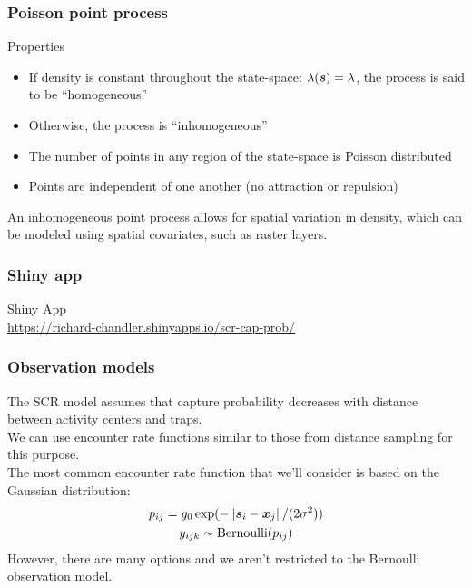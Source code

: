 \documentclass[color=usenames,dvipsnames]{beamer}\usepackage[]{graphicx}\usepackage[]{color}
\begin{document}
\begin{frame}
  \frametitle{Poisson point process}
  Properties
  \begin{itemize}
    \item If density is constant throughout the state-space:
      $\lambda({\bm s}) = \lambda$, the process is said to be
      ``homogeneous''
    \item Otherwise, the process is ``inhomogeneous''
    \item The number of points in any region of the state-space is
      Poisson distributed
    \item Points are independent of one another (no attraction or
      repulsion) 
  \end{itemize}
  \pause
  \vfill
  An inhomogeneous point process allows for spatial variation
  in density, which can be modeled using \alert{spatial covariates},
  such as raster layers. \\
\end{frame}






\begin{frame}
  \frametitle{Shiny app}
  \LARGE
  \centering
  Shiny App \\
  \vfill
  \normalsize
  \color{blue}
  \url{
    https://richard-chandler.shinyapps.io/scr-cap-prob/
  } \\
\end{frame}




\begin{frame}
  \frametitle{Observation models}
  The SCR model assumes that capture probability decreases with
  distance between activity centers and traps. \\
  \pause
  \vfill
  We can use encounter rate functions similar to those from distance 
  sampling for this purpose. \\
  \pause
  \vfill
  The most common encounter rate function that we'll consider is based
  on the Gaussian distribution:
  \begin{gather*}
    p_{ij} = g_0\exp(-\|{\bm s}_i - {\bm x}_j\|/(2\sigma^2)) \\
    y_{ijk} \sim \mathrm{Bernoulli}(p_{ij}) 
  \end{gather*}
  \pause
  However, there are many options and we aren't restricted to the
  Bernoulli observation model. 
\end{frame}
\end{document}
